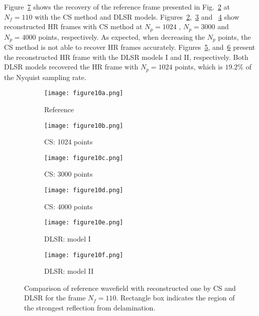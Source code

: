 Figure~\ref{fig:frame110_comparison} shows the recovery of the reference frame presented in Fig.~\ref{fig:frame110_CS1024} at $N_f=110$ with the CS method and DLSR models.
Figures~\ref{fig:frame110_CS1024},~\ref{fig:frame110_CS3000} and ~\ref{fig:frame110_CS4000} show reconstructed HR frames with CS method at $N_p=1024$ , $N_p=3000$ and $N_p=4000$ points, respectively.
As expected, when decreasing the $N_p$ points, the CS method is not able to recover HR frames accurately.
Figures~\ref{fig:frame110_Abdalraheem}, and~\ref{fig:frame110_Saeed} present the reconstructed HR frame with the DLSR models I and II, respectively.
Both DLSR models recovered the HR frame with $N_p=1024$ points, which is \(19.2\%\) of the Nyquist sampling rate.

\begin{figure} []
	\centering
	\begin{subfigure}[b]{0.32\textwidth}
		\centering
		\texttt{[image: figure10a.png]}
		\caption{Reference}
		\label{fig:frame110_ref}
	\end{subfigure}
	\hfill
	\begin{subfigure}[b]{0.32\textwidth}
		\centering
		\texttt{[image: figure10b.png]}
		\caption{CS: 1024 points}
		\label{fig:frame110_CS1024}
	\end{subfigure}
	\hfill
	\begin{subfigure}[b]{0.32\textwidth}
		\centering
		\texttt{[image: figure10c.png]}
		\caption{CS: 3000 points}
		\label{fig:frame110_CS3000}
	\end{subfigure}	
	\hfill
	\begin{subfigure}[b]{0.32\textwidth}
		\centering
		\texttt{[image: figure10d.png]}
		\caption{CS: 4000 points}
		\label{fig:frame110_CS4000}
	\end{subfigure}
	\hfill
	\begin{subfigure}[b]{0.32\textwidth}
		\centering
		\texttt{[image: figure10e.png]}
		\caption{DLSR: model I}
		\label{fig:frame110_Abdalraheem}
	\end{subfigure}
	\hfill
	\begin{subfigure}[b]{0.32\textwidth}
		\centering
		\texttt{[image: figure10f.png]}
		\caption{DLSR: model II}
		\label{fig:frame110_Saeed}
	\end{subfigure}
	
	\caption{Comparison of reference wavefield with reconstructed one by CS and DLSR for the frame $N_f = 110$. Rectangle box indicates the region of the strongest reflection from delamination.}
	\label{fig:frame110_comparison}
\end{figure} 

